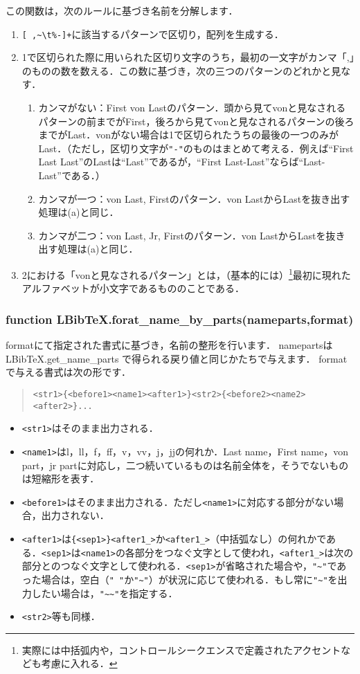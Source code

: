 \documentclass[dvipdfmx,a4paper]{jsarticle}
\begin{document}
この関数は，次のルールに基づき名前を分解します．
\begin{enumerate}
\item \verb|[ ,~\t%-]+|に該当するパターンで区切り，配列を生成する．
\item 1で区切られた際に用いられた区切り文字のうち，最初の一文字がカンマ「,」のものの数を数える．この数に基づき，次の三つのパターンのどれかと見なす．
\begin{enumerate}
\item カンマがない：First von Lastのパターン．頭から見てvonと見なされるパターンの前までがFirst，後ろから見てvonと見なされるパターンの後ろまでがLast．vonがない場合は1で区切られたうちの最後の一つのみがLast．（ただし，区切り文字が\verb|"-"|のものはまとめて考える．例えば``First Last Last''のLastは``Last''であるが，``First Last-Last''ならば``Last-Last''である．）
\item カンマが一つ：von Last, Firstのパターン．von LastからLastを抜き出す処理は(a)と同じ．
\item カンマが二つ：von Last, Jr, Firstのパターン．von LastからLastを抜き出す処理は(a)と同じ．
\end{enumerate}
\item 2における「vonと見なされるパターン」とは，（基本的には）\footnote{実際には中括弧内や，コントロールシークエンスで定義されたアクセントなども考慮に入れる．}最初に現れたアルファベットが小文字であるもののことである．
\end{enumerate}


\subsubsection{function LBibTeX.forat\_name\_by\_parts(nameparts,format)}
formatにて指定された書式に基づき，名前の整形を行います．
namepartsはLBibTeX.get\_name\_parts で得られる戻り値と同じかたちで与えます．
formatで与える書式は次の形です．
\begin{quote}
\begin{verbatim}
<str1>{<before1><name1><after1>}<str2>{<before2><name2><after2>}...
\end{verbatim}
\end{quote}
\begin{itemize}
\item \verb|<str1>|はそのまま出力される．
\item \verb|<name1>|はl，ll，f，ff，v，vv，j，jjの何れか．Last name，First name，von part，jr partに対応し，二つ続いているものは名前全体を，そうでないものは短縮形を表す．
\item \verb|<before1>|はそのまま出力される．ただし\verb|<name1>|に対応する部分がない場合，出力されない．
\item \verb|<after1>|は\verb|{<sep1>}<after1_>|か\verb|<after1_>|（中括弧なし）の何れかである．\verb|<sep1>|は\verb|<name1>|の各部分をつなぐ文字として使われ，\verb|<after1_>|は次の部分とのつなぐ文字として使われる．\verb|<sep1>|が省略された場合や，\verb|"~"|であった場合は，空白（\verb|" "|か\verb|"~"|）が状況に応じて使われる．もし常に\verb|"~"|を出力したい場合は，\verb|"~~"|を指定する．
\item \verb|<str2>|等も同様．
\end{itemize}
\end{document}

